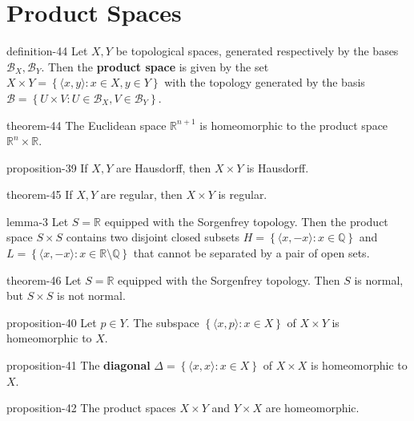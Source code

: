 \documentclass[10pt,]{article}
\newcommand{\terminology}[1]{\textbf{#1}}
\newcommand{\tuple}[1]{\langle #1 \rangle}
\newcommand{\mb}{\mathbb}
\newcommand{\mc}{\mathcal}
\newcommand{\setBuilder}[2]{\left\{#1:#2\right\}}
\begin{document}
\section[{Product Spaces}]{Product Spaces}\label{section-product}
\begin{definition}{}{definition-44}%
\hypertarget{p-172}{}%
Let \(X,Y\) be topological spaces, generated respectively by the bases \(\mc B_X,\mc B_Y\). Then the \terminology{product space} is given by the set \(X\times Y=\setBuilder{\tuple{x,y}}{x\in X,y\in Y}\) with the topology generated by the basis \(\mc B=\setBuilder{U\times V}{U\in\mc B_X,V\in\mc B_Y}\).%
\end{definition}
\begin{theorem}{}{}{theorem-44}%
\hypertarget{p-173}{}%
The Euclidean space \(\mb R^{n+1}\) is homeomorphic to the product space \(\mb R^n\times\mb R\).%
\end{theorem}
\begin{proposition}{}{}{proposition-39}%
\hypertarget{p-174}{}%
If \(X,Y\) are Hausdorff, then \(X\times Y\) is Hausdorff.%
\end{proposition}
\begin{theorem}{}{}{theorem-45}%
\hypertarget{p-175}{}%
If \(X,Y\) are regular, then \(X\times Y\) is regular.%
\end{theorem}
\begin{lemma}{}{}{lemma-3}%
\hypertarget{p-176}{}%
Let \(S=\mb R\) equipped with the Sorgenfrey topology. Then the product space \(S\times S\) contains two disjoint closed subsets \(H=\setBuilder{\tuple{x,-x}}{x\in\mb Q}\) and \(L=\setBuilder{\tuple{x,-x}}{x\in\mb R\setminus\mb Q}\) that cannot be separated by a pair of open sets.%
\end{lemma}
\begin{theorem}{}{}{theorem-46}%
\hypertarget{p-177}{}%
Let \(S=\mb R\) equipped with the Sorgenfrey topology. Then \(S\) is normal, but \(S\times S\) is not normal.%
\end{theorem}
\begin{proposition}{}{}{proposition-40}%
\hypertarget{p-178}{}%
Let \(p\in Y\). The subspace \(\setBuilder{\tuple{x,p}}{x\in X}\) of \(X\times Y\) is homeomorphic to \(X\).%
\end{proposition}
\begin{proposition}{}{}{proposition-41}%
\hypertarget{p-179}{}%
The \terminology{diagonal} \(\Delta=\setBuilder{\tuple{x,x}}{x\in X}\) of \(X\times X\) is homeomorphic to \(X\).%
\end{proposition}
\begin{proposition}{}{}{proposition-42}%
\hypertarget{p-180}{}%
The product spaces \(X\times Y\) and \(Y\times X\) are homeomorphic.%
\end{proposition}
\end{document}
